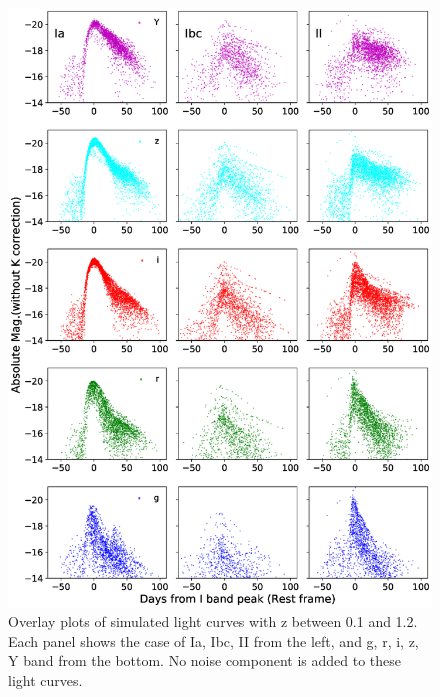 \documentclass[useamsfonts]{pasj01}
\begin{document}
%
\begin{figure}[ht]
  \begin{center}
     \includegraphics[width=\columnwidth]{figures/SimLCsamples.eps}
  \end{center}
  \caption{%
  Overlay plots of simulated light curves with z between 0.1 and 1.2.
  Each panel shows the case of Ia, Ibc, II from the left, and g, r, i, z, Y band from the bottom.
  No noise component is added to these light curves.
  }%
  \label{fig:simLCsamples}
\end{figure}
%
%
\end{document}
